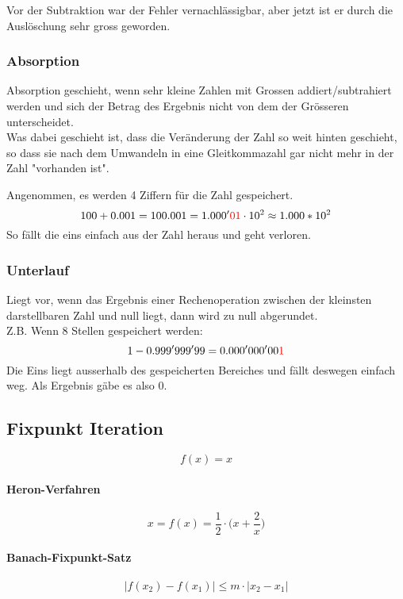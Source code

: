 Vor der Subtraktion war der Fehler vernachlässigbar, aber jetzt ist er durch die Auslöschung sehr gross geworden.

\subsubsection{Absorption}
Absorption geschieht, wenn sehr kleine Zahlen mit Grossen addiert/subtrahiert werden und sich der Betrag des Ergebnis nicht von dem der Grösseren unterscheidet. \\
Was dabei geschieht ist, dass die Veränderung der Zahl so weit hinten geschieht, so dass sie nach dem Umwandeln in eine Gleitkommazahl gar nicht mehr in der Zahl "vorhanden ist".
\begin{exmp}
	Angenommen, es werden 4 Ziffern für die Zahl gespeichert.
	\begin{displaymath}
		100+0.001=100.001 = 1.000'{\color{red}01} \cdot 10^2
		\approx 1.000 * 10^2
	\end{displaymath}
	So fällt die eins einfach aus der Zahl heraus und geht verloren.
\end{exmp}

\subsubsection{Unterlauf}
Liegt vor, wenn das Ergebnis einer Rechenoperation zwischen der kleinsten darstellbaren Zahl und null liegt, dann wird zu null abgerundet. \\
Z.B. Wenn 8 Stellen gespeichert werden:
\begin{displaymath}
	1-0.999'999'99 = 0.000'000'00 {\color{red} 1}
\end{displaymath}
Die Eins liegt ausserhalb des gespeicherten Bereiches und fällt deswegen einfach weg. Als Ergebnis gäbe es also  0.

\subsection{Fixpunkt Iteration}

\begin{displaymath}
	f(x) = x
\end{displaymath}

\paragraph{Heron-Verfahren}

\begin{displaymath}
	x = f(x) = \frac{1}{2} \cdot \biggl ( x + \frac{2}{x} \biggr )
\end{displaymath}

\paragraph{Banach-Fixpunkt-Satz}

\begin{displaymath}
	|f(x_2) - f(x_1)| \leq	m \cdot |x_2 - x_1|
\end{displaymath}